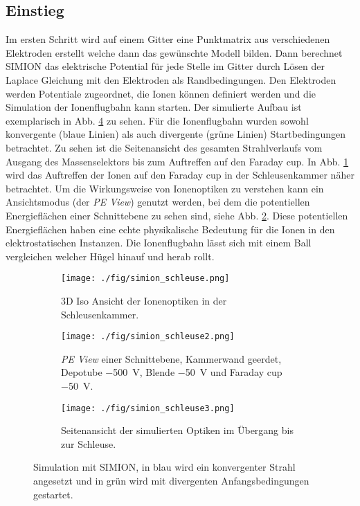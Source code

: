 \subsection{Einstieg}
Im ersten Schritt wird auf einem Gitter eine Punktmatrix aus verschiedenen Elektroden erstellt welche dann das gewünschte Modell bilden.
Dann berechnet SIMION das elektrische Potential für jede Stelle im Gitter durch Lösen der Laplace Gleichung mit den Elektroden als Randbedingungen.
Den Elektroden werden Potentiale zugeordnet, die Ionen können definiert werden und die Simulation der Ionenflugbahn kann starten.
Der simulierte Aufbau ist exemplarisch in Abb. \ref{fig:simion_schleuse} zu sehen.
Für die Ionenflugbahn wurden sowohl konvergente (blaue Linien) als auch divergente (grüne Linien) Startbedingungen betrachtet.
Zu sehen ist die Seitenansicht des gesamten Strahlverlaufs vom Ausgang des Massenselektors bis zum Auftreffen auf den Faraday cup.
In Abb. \ref{fig:0} wird das Auftreffen der Ionen auf den Faraday cup in der Schleusenkammer näher betrachtet.
Um die Wirkungsweise von Ionenoptiken zu verstehen kann ein Ansichtsmodus (der \textit{PE View}) genutzt werden, bei dem die potentiellen Energieflächen einer Schnittebene zu sehen sind, siehe Abb. \ref{fig:1}.
Diese potentiellen Energieflächen haben eine echte physikalische Bedeutung für die Ionen in den elektrostatischen Instanzen.
Die Ionenflugbahn lässt sich mit einem Ball vergleichen welcher Hügel hinauf und herab rollt.
\begin{figure}
  \centering
  \begin{subfigure}[h]{0.45\textwidth}
    \texttt{[image: ./fig/simion\_schleuse.png]}
    \caption{3D Iso Ansicht der Ionenoptiken in der Schleusenkammer.}
    \label{fig:0}
  \end{subfigure}\hfill
  \begin{subfigure}[h]{0.5\textwidth}
    \texttt{[image: ./fig/simion\_schleuse2.png]}
    \caption{\textit{PE View} einer Schnittebene, Kammerwand geerdet, Depotube \SI{-500}{\volt}, Blende \SI{-50}{\volt} und Faraday cup \SI{-50}{\volt}.}
    \label{fig:1}
  \end{subfigure}\hfill
  \begin{subfigure}[b]{1\textwidth}
    \texttt{[image: ./fig/simion\_schleuse3.png]}
    \caption{Seitenansicht der simulierten Optiken im Übergang bis zur Schleuse.}
    \label{fig:2}
  \end{subfigure}
  \caption{Simulation mit SIMION, in blau wird ein konvergenter Strahl angesetzt und in grün wird mit divergenten Anfangsbedingungen gestartet.}
  \label{fig:simion_schleuse}
\end{figure}

